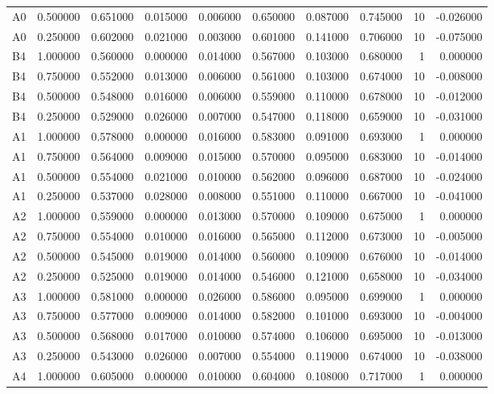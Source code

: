 \begin{table}
\begin{tabular}{lrrrrrrrrr}
A0 & 0.500000 & 0.651000 & 0.015000 & 0.006000 & 0.650000 & 0.087000 & 0.745000 & 10 & -0.026000 \\
A0 & 0.250000 & 0.602000 & 0.021000 & 0.003000 & 0.601000 & 0.141000 & 0.706000 & 10 & -0.075000 \\
B4 & 1.000000 & 0.560000 & 0.000000 & 0.014000 & 0.567000 & 0.103000 & 0.680000 & 1 & 0.000000 \\
B4 & 0.750000 & 0.552000 & 0.013000 & 0.006000 & 0.561000 & 0.103000 & 0.674000 & 10 & -0.008000 \\
B4 & 0.500000 & 0.548000 & 0.016000 & 0.006000 & 0.559000 & 0.110000 & 0.678000 & 10 & -0.012000 \\
B4 & 0.250000 & 0.529000 & 0.026000 & 0.007000 & 0.547000 & 0.118000 & 0.659000 & 10 & -0.031000 \\
A1 & 1.000000 & 0.578000 & 0.000000 & 0.016000 & 0.583000 & 0.091000 & 0.693000 & 1 & 0.000000 \\
A1 & 0.750000 & 0.564000 & 0.009000 & 0.015000 & 0.570000 & 0.095000 & 0.683000 & 10 & -0.014000 \\
A1 & 0.500000 & 0.554000 & 0.021000 & 0.010000 & 0.562000 & 0.096000 & 0.687000 & 10 & -0.024000 \\
A1 & 0.250000 & 0.537000 & 0.028000 & 0.008000 & 0.551000 & 0.110000 & 0.667000 & 10 & -0.041000 \\
A2 & 1.000000 & 0.559000 & 0.000000 & 0.013000 & 0.570000 & 0.109000 & 0.675000 & 1 & 0.000000 \\
A2 & 0.750000 & 0.554000 & 0.010000 & 0.016000 & 0.565000 & 0.112000 & 0.673000 & 10 & -0.005000 \\
A2 & 0.500000 & 0.545000 & 0.019000 & 0.014000 & 0.560000 & 0.109000 & 0.676000 & 10 & -0.014000 \\
A2 & 0.250000 & 0.525000 & 0.019000 & 0.014000 & 0.546000 & 0.121000 & 0.658000 & 10 & -0.034000 \\
A3 & 1.000000 & 0.581000 & 0.000000 & 0.026000 & 0.586000 & 0.095000 & 0.699000 & 1 & 0.000000 \\
A3 & 0.750000 & 0.577000 & 0.009000 & 0.014000 & 0.582000 & 0.101000 & 0.693000 & 10 & -0.004000 \\
A3 & 0.500000 & 0.568000 & 0.017000 & 0.010000 & 0.574000 & 0.106000 & 0.695000 & 10 & -0.013000 \\
A3 & 0.250000 & 0.543000 & 0.026000 & 0.007000 & 0.554000 & 0.119000 & 0.674000 & 10 & -0.038000 \\
A4 & 1.000000 & 0.605000 & 0.000000 & 0.010000 & 0.604000 & 0.108000 & 0.717000 & 1 & 0.000000 \\

\end{tabular}
\end{table}

